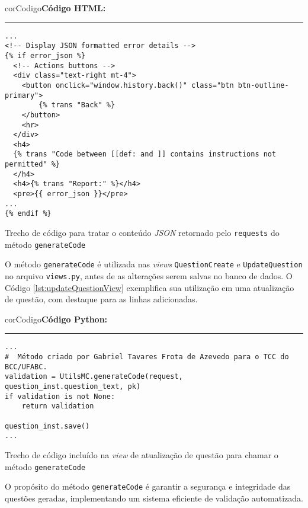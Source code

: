 \begin{listing}[!ht]
    \begin{myboxCode}{corCodigo}{\textbf{Código HTML: }}\vspace{3mm}
    \hrule
    \begin{verbatim}
...
<!-- Display JSON formatted error details -->
{% if error_json %}
  <!-- Actions buttons -->
  <div class="text-right mt-4">
    <button onclick="window.history.back()" class="btn btn-outline-primary">
        {% trans "Back" %}
    </button>
    <hr>
  </div>
  <h4>
  {% trans "Code between [[def: and ]] contains instructions not permitted" %}
  </h4>
  <h4>{% trans "Report:" %}</h4>
  <pre>{{ error_json }}</pre>
...
{% endif %}
\end{verbatim}
\end{myboxCode}
\caption{Trecho de código para tratar o conteúdo \textit{JSON} retornado pelo \texttt{requests} do método \texttt{generateCode}}
\label{lst:erroHTML}
\end{listing}


O método \texttt{generateCode} é utilizada nas \textit{views} \texttt{QuestionCreate} e \texttt{UpdateQuestion} no arquivo \texttt{views.py}, antes de as alterações serem salvas no banco de dados. O Código \ref{lst:updateQuestionView} exemplifica sua utilização em uma atualização de questão, com destaque para as linhas adicionadas.

\begin{listing}[!ht]
    \begin{myboxCode}{corCodigo}{\textbf{Código Python: }}\vspace{3mm}
    \hrule
    \begin{verbatim}
...
#  Método criado por Gabriel Tavares Frota de Azevedo para o TCC do BCC/UFABC.
validation = UtilsMC.generateCode(request, question_inst.question_text, pk)
if validation is not None:
    return validation

question_inst.save()
...
\end{verbatim}
\end{myboxCode}
\caption{Trecho de código incluído na \textit{view} de atualização de questão para chamar o método \texttt{generateCode}}
\label{lst:updateQuestionView}
\end{listing}


O propósito do método \texttt{generateCode} é garantir a segurança e integridade das questões geradas, implementando um sistema eficiente de validação automatizada.

